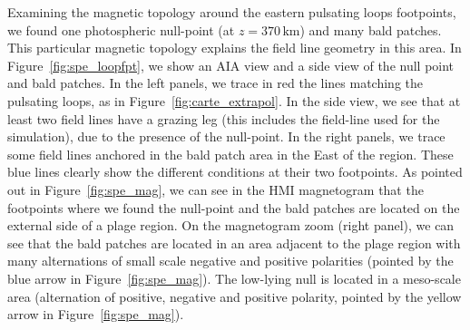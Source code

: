 \documentclass[preprint2]{aastex6}
\begin{document}

	\begin{figure*}
		\centering
			   
		  \caption{Left: The HMI magnetogram on June 06, 2012 23:12 UT. It covers the field of view used for the extrapolations (519 Mm $\times$ 444 Mm). The green box delimits the area where we zoom (right panel) to focus on topological elements. Right: Zoom on the magnetogram in the area where most of the field lines matching the pulsating loops are rooted. The blue and yellow arrows indicate, respectively, areas corresponding to the bald patches region and to the photospheric null point region. For this zoom, we use the non-binned HMI magnetogram version.}
                 \label{fig:spe_mag}
	\end{figure*}

\medskip

Examining the magnetic topology around the eastern pulsating loops footpoints, we found one photospheric null-point (at $z=370 \, \mathrm{km}$) and many bald patches. This particular magnetic topology explains the field line geometry in this area. In Figure~\ref{fig:spe_loopfpt}, we show an AIA view and a side view of the null point and bald patches. In the left panels, we trace in red the lines matching the pulsating loops, as in Figure~\ref{fig:carte_extrapol}. In the side view, we see that at least two field lines have a grazing leg (this includes the field-line used for the simulation), due to the presence of the null-point. In the right panels, we trace some field lines anchored in the bald patch area in the East of the region. These blue lines clearly show the different conditions at their two footpoints. As pointed out in Figure~\ref{fig:spe_mag}, we can see in the HMI magnetogram that the footpoints where we found the null-point and the bald patches are located on the external side of a plage region. On the magnetogram zoom (right panel), we can see that the bald patches are located in an area adjacent to the plage region with many alternations of small scale negative and positive polarities (pointed by the blue arrow in Figure~\ref{fig:spe_mag}). The low-lying null is located in a meso-scale area (alternation of positive, negative and positive polarity, pointed by the yellow arrow in Figure~\ref{fig:spe_mag}).
\end{document}

